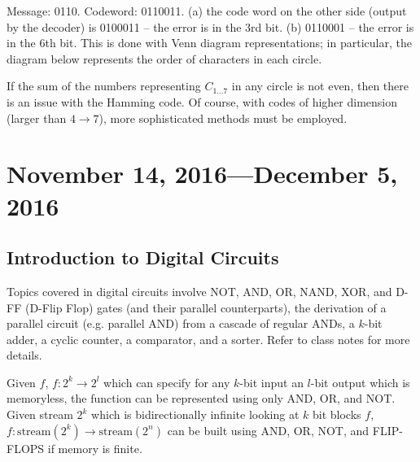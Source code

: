 \documentclass[11pt]{article}
\theoremstyle{definition}
\begin{document}
\example Message: 0110. Codeword: 0110011. (a) the code word on the other side (output by the decoder) is 0100011 -- the error is in the 3rd bit. (b) 0110001 -- the error is in the 6th bit. This is done with Venn diagram representations; in particular, the diagram below represents the order of characters in each circle. 
\begin{figure}[ht]
\centering
\end{figure}

\noindent If the sum of the numbers representing $C_{1\dots7}$ in any circle is not even, then there is an issue with the Hamming code. Of course, with codes of higher dimension (larger than $4 \rightarrow 7$), more sophisticated methods must be employed. 

\section{November 14, 2016---December 5, 2016} 

\subsection{Introduction to Digital Circuits}

Topics covered in digital circuits involve NOT, AND, OR, NAND, XOR, and D-FF (D-Flip Flop) gates (and their parallel counterparts), the derivation of a parallel circuit (e.g. parallel AND) from a cascade of regular ANDs, a $k$-bit adder, a cyclic counter, a comparator, and a sorter. Refer to class notes for more details. 

\theorem Given $f$, $f : 2^k \rightarrow 2^l$ which can specify for any $k$-bit input an $l$-bit output which is memoryless, the function can be represented using only AND, OR, and NOT. 
\theorem Given stream $2^k$ which is bidirectionally infinite looking at $k$ bit blocks $f$, $f: \text{stream}(2^k) \rightarrow \text{stream}(2^n)$ can be built using AND, OR, NOT, and FLIP-FLOPS if memory is finite. 
\end{document}
